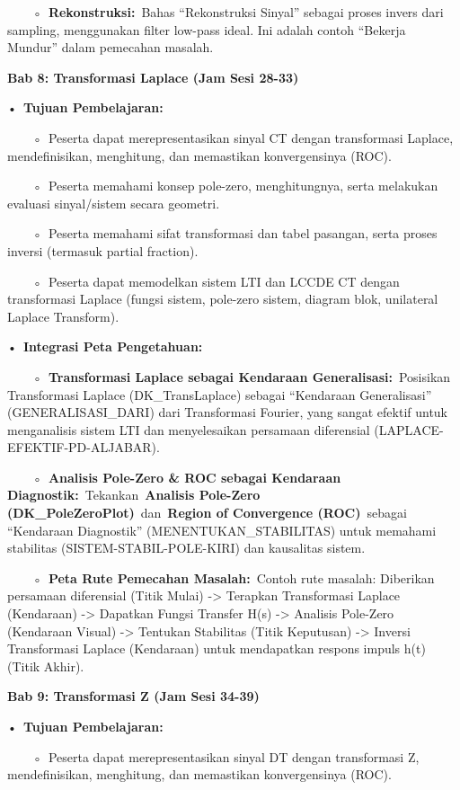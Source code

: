 \documentclass[
  letterpaper,
  DIV=11,
  numbers=noendperiod]{scrreprt}
\begin{document}
~~~~◦~\textbf{Rekonstruksi:}~Bahas ``Rekonstruksi Sinyal'' sebagai
proses invers dari sampling, menggunakan filter low-pass ideal. Ini
adalah contoh ``Bekerja Mundur'' dalam pemecahan masalah.

\textbf{Bab 8: Transformasi Laplace (Jam Sesi 28-33)}

•~\textbf{Tujuan Pembelajaran:}

~~~~◦~Peserta dapat merepresentasikan sinyal CT dengan transformasi
Laplace, mendefinisikan, menghitung, dan memastikan konvergensinya
(ROC).

~~~~◦~Peserta memahami konsep pole-zero, menghitungnya, serta melakukan
evaluasi sinyal/sistem secara geometri.

~~~~◦~Peserta memahami sifat transformasi dan tabel pasangan, serta
proses inversi (termasuk partial fraction).

~~~~◦~Peserta dapat memodelkan sistem LTI dan LCCDE CT dengan
transformasi Laplace (fungsi sistem, pole-zero sistem, diagram blok,
unilateral Laplace Transform).

•~\textbf{Integrasi Peta Pengetahuan:}

~~~~◦~\textbf{Transformasi Laplace sebagai Kendaraan
Generalisasi:}~Posisikan Transformasi Laplace (DK\_TransLaplace) sebagai
``Kendaraan Generalisasi'' (GENERALISASI\_DARI) dari Transformasi
Fourier, yang sangat efektif untuk menganalisis sistem LTI dan
menyelesaikan persamaan diferensial (LAPLACE-EFEKTIF-PD-ALJABAR).

~~~~◦~\textbf{Analisis Pole-Zero \& ROC sebagai Kendaraan
Diagnostik:}~Tekankan~\textbf{Analisis Pole-Zero
(DK\_PoleZeroPlot)}~dan~\textbf{Region of Convergence (ROC)}~sebagai
``Kendaraan Diagnostik'' (MENENTUKAN\_STABILITAS) untuk memahami
stabilitas (SISTEM-STABIL-POLE-KIRI) dan kausalitas sistem.

~~~~◦~\textbf{Peta Rute Pemecahan Masalah:}~Contoh rute masalah:
Diberikan persamaan diferensial (Titik Mulai) -\textgreater{} Terapkan
Transformasi Laplace (Kendaraan) -\textgreater{} Dapatkan Fungsi
Transfer H(s) -\textgreater{} Analisis Pole-Zero (Kendaraan Visual)
-\textgreater{} Tentukan Stabilitas (Titik Keputusan) -\textgreater{}
Inversi Transformasi Laplace (Kendaraan) untuk mendapatkan respons
impuls h(t) (Titik Akhir).

\textbf{Bab 9: Transformasi Z (Jam Sesi 34-39)}

•~\textbf{Tujuan Pembelajaran:}

~~~~◦~Peserta dapat merepresentasikan sinyal DT dengan transformasi Z,
mendefinisikan, menghitung, dan memastikan konvergensinya (ROC).
\end{document}
